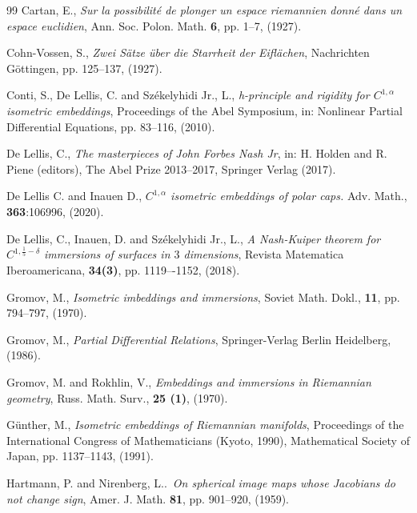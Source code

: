 \documentclass[reqno,twoside,11pt]{amsart}
\numberwithin{equation}{section}
\theoremstyle{plain}
\theoremstyle{definition}
\begin{document}
\begin{thebibliography}{99}
 {\sc Cartan, E.}, {\em Sur la possibilit\'e de plonger un
  espace riemannien donn\'e dans un espace
  euclidien}, Ann. Soc. Polon. Math. {\bf 6}, pp. 1--7, (1927).

 {\sc Cohn-Vossen, S.},  {\em Zwei S\"atze \"uber die
    Starrheit der Eifl\"achen}, Nachrichten G\"ottingen, pp. 125--137, (1927).

 {\sc Conti, S., De Lellis, C. and Sz\'ekelyhidi Jr.,
    L.}, {\em h-principle and rigidity for $C^{1,\alpha}$ isometric embeddings},
Proceedings of the Abel Symposium, in: Nonlinear Partial Differential
Equations, pp. 83--116, (2010).

 {\sc De Lellis, C.}, {\em The masterpieces of
    John Forbes Nash Jr}, in: H. Holden and R. Piene (editors), The
  Abel Prize 2013–2017, Springer Verlag (2017).

 {\sc De Lellis C. and Inauen D.},
 {\em $C^{1,\alpha}$ isometric embeddings of polar caps.}
 Adv. Math., {\bf 363}:106996, (2020).  

 {\sc De Lellis, C., Inauen, D. and Sz\'ekelyhidi Jr.,
    L.}, {\em A Nash-Kuiper theorem for $C^{1,\frac{1}{5}-\delta}$ immersions of
surfaces in $3$ dimensions}, Revista Matematica Iberoamericana, {\bf
34(3)}, pp. 1119–-1152, (2018).

 {\sc Gromov, M.}, {\em Isometric imbeddings and
    immersions}, Soviet Math. Dokl., {\bf 11}, pp. 794--797, (1970).

 {\sc Gromov, M.}, {\em Partial Differential
    Relations}, Springer-Verlag Berlin Heidelberg, (1986). 

 {\sc Gromov, M.  and Rokhlin, V.}, {\em
Embeddings and immersions in Riemannian geometry},
Russ. Math. Surv., {\bf 25 (1)}, (1970).

 {\sc G\"unther, M.}, {\em Isometric embeddings of
    Riemannian manifolds}, 
Proceedings of the International Congress of Mathematicians (Kyoto, 1990), Mathematical Society of
Japan,  pp. 1137--1143, (1991).


 {\sc Hartmann, P. and Nirenberg, L.}.\, {\em On
    spherical image maps whose Jacobians 
do not change sign}, Amer. J. Math. {\bf 81}, pp. 901--920, (1959). 


\end{thebibliography}
\end{document}
